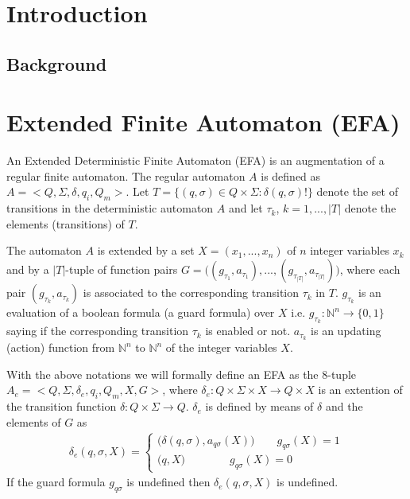 \documentclass{article}
\begin{document}
\tableofcontents
\section{Introduction}

\subsection{Background}

\section{Extended Finite Automaton (EFA)}
An Extended Deterministic Finite Automaton (EFA) is an
augmentation of a regular finite automaton. The regular automaton
$A$ is defined as $A=<Q,\Sigma,\delta, q_i,Q_m>$. Let
$T=\{(q,\sigma)\in Q \times \Sigma: \delta(q,\sigma)!\}$ denote
the set of transitions in the deterministic automaton $A$ and let
$\tau_k$, $k=1,...,|T|$ denote the elements (transitions) of $T$.

The automaton $A$ is extended by a set $X=(x_1,...,x_n)$ of $n$
integer variables $x_{k}$ and by a $|T|$-tuple of function pairs
$G=\big((g_{\tau_1},a_{\tau_1}),...,
(g_{\tau_{|T|}},a_{\tau_{|T|}})\big)$, where each pair
$(g_{\tau_k},a_{\tau_k})$ is associated to the corresponding
transition $\tau_k$ in $T$. $g_{\tau_k}$ is an evaluation of a
boolean formula (a guard formula) over $X$ i.e.
$g_{\tau_k}:{\mathbb{N}}^{n}\rightarrow \{0,1\}$ saying if the
corresponding transition $\tau_k$ is enabled or not. $a_{\tau_k}$
is an updating (action) function from ${\mathbb{N}}^{n}$ to
${\mathbb{N}}^{n}$ of the integer variables $X$.

With the above notations we will formally define an EFA as the
$8$-tuple $A_{e}=<Q, \Sigma, \delta_{e}, q_i, Q_m, X, G>$, where
$\delta_{e}: Q \times \Sigma \times X \rightarrow Q\times X $ is
an extention of the transition function $\delta:Q \times \Sigma
\rightarrow Q$. $\delta_e$ is defined by means of $\delta$ and the
elements of $G$ as
\begin{eqnarray}
\delta_{e}(q,\sigma,X)=\left\{
\begin{array}{ll}
(\delta(q,\sigma),a_{q \sigma}(X)\big)\quad\quad g_{q \sigma}(X)=1\\
\big(q,X \big)\quad\quad\quad\quad g_{q \sigma}(X)=0
\end{array}\right.
\end{eqnarray}
If the guard formula $g_{q \sigma}$ is undefined then
$\delta_{e}(q,\sigma,X)$ is undefined.
\end{document}
